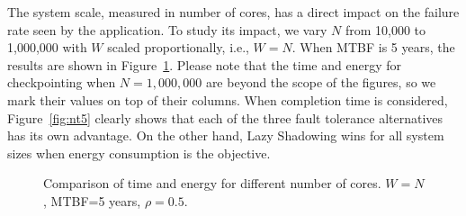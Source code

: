 The system scale, measured in number of cores, has a direct impact on the failure rate seen by the application. To study its impact, we vary $N$ from 10,000 to 1,000,000 with $W$ scaled proportionally, i.e., $W=N$. When MTBF is 5 years, the results are shown in Figure~\ref{fig:n5}. Please note that the time and energy for checkpointing when $N=1,000,000$ are beyond the scope of the figures, so we mark their values on top of their columns. When completion time is considered, Figure~\ref{fig:nt5} clearly shows that each of the three fault tolerance alternatives has its own advantage. %
On the other hand, Lazy Shadowing wins for all system sizes when energy consumption is the objective. 


\begin{figure}[!t]
	\begin{center}
	\end{center}
	\caption{Comparison of time and energy for different number of cores. $W=N$, MTBF=5 years, $\rho=0.5$.}
	\label{fig:n5}
\end{figure}


